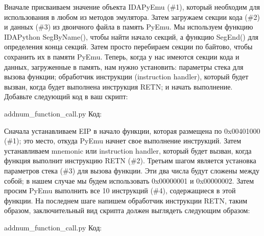 \documentclass[12pt]{book}
\begin{document}



Вначале присваиваем значение объекта IDAPyEmu (\#1), который необходим для использования в любом из методов эмулятора. Затем загружаем секции кода (\#2) и данных (\#3) из двоичного файла в память PyEmu. Мы используем функцию IDAPython SegByName(), чтобы найти начало секций, а функцию SegEnd() для определения конца секций. Затем просто перебираем секции по байтово, чтобы сохранить их в памяти PyEmu. Теперь, когда у нас имеются секции кода и данных, загруженные в память, нам нужно установить: параметры стека для вызова функции; обработчик инструкции (instruction handler), который будет вызван, когда будет выполнена инструкция RETN; и начать выполнение. Добавьте следующий код в ваш скрипт:

addnum\_function\_call.py
Код:




Сначала устанавливаем EIP в начало функции, которая размещена по 0x00401000 (\#1); это место, откуда PyEmu начнет свое выполнение инструкций. Затем устанавливаем mnemonic или instruction handler, который будет вызван, когда функция выполнит инструкцию RETN (\#2). Третьим шагом является установка параметров стека (\#3) для вызова функции. Эти два числа будут сложены между собой; в нашем случае мы будем использовать 0x00000001 и 0x00000002. Затем просим PyEmu выполнить все 10 инструкций (\#4), содержащиеся в этой функции. На последнем шаге напишем обработчик инструкции RETN, таким образом, заключительный вид скрипта должен выглядеть следующим образом:

addnum\_function\_call.py
Код:
\end{document}
